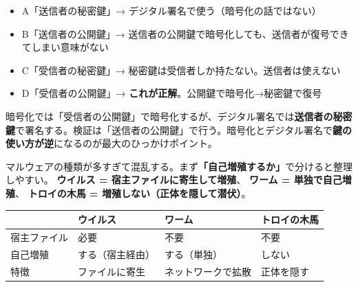 \begin{goutoubun}
\begin{itemize}
  \item A「送信者の秘密鍵」→ デジタル署名で使う（暗号化の話ではない）
  \item B「送信者の公開鍵」→ 送信者の公開鍵で暗号化しても、送信者が復号できてしまい意味がない
  \item C「受信者の秘密鍵」→ 秘密鍵は受信者しか持たない。送信者は使えない
  \item D「受信者の公開鍵」→ \textbf{これが正解}。公開鍵で暗号化→秘密鍵で復号
\end{itemize}
\end{goutoubun}


\begin{trickwarn}
暗号化では「受信者の公開鍵」で暗号化するが、デジタル署名では\textbf{送信者の秘密鍵}で署名する。検証は「送信者の公開鍵」で行う。暗号化とデジタル署名で\textbf{鍵の使い方が逆}になるのが最大のひっかけポイント。
\end{trickwarn}





\mondaipage
{}

\begin{stumble}
マルウェアの種類が多すぎて混乱する。まず\textbf{「自己増殖するか」}で分けると整理しやすい。
\textbf{ウイルス = 宿主ファイルに寄生して増殖}、
\textbf{ワーム = 単独で自己増殖}、
\textbf{トロイの木馬 = 増殖しない（正体を隠して潜伏）}。
\end{stumble}

\begin{comparison}
\begin{tabularx}{\textwidth}{lXXX}
  \toprule
  & \textbf{ウイルス} & \textbf{ワーム} & \textbf{トロイの木馬} \\
  \midrule
  宿主ファイル & 必要 & 不要 & 不要 \\
  自己増殖 & する（宿主経由） & する（単独） & しない \\
  特徴 & ファイルに寄生 & ネットワークで拡散 & 正体を隠す \\
  \bottomrule
\end{tabularx}
\end{comparison}

